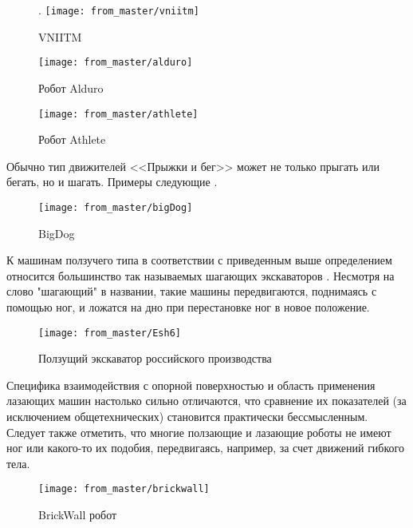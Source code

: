 \begin{figure}[H].
\centering\texttt{[image: from\_master/vniitm]}
\caption{VNIITM}
\label{fig:vniitm}
\end{figure}

\begin{figure}[H]
\centering\texttt{[image: from\_master/alduro]}
\caption{Робот Alduro}
\label{fig:alduro}
\end{figure}

\begin{figure}[H]
\centering\texttt{[image: from\_master/athlete]}
\caption{Робот Athlete}
\label{fig:athlete}
\end{figure}

Обычно тип движителей <<Прыжки и бег>> может не только прыгать или бегать, но и шагать. Примеры следующие \cite{Pavl2013,Volkova2013modeling,bidgoly2010learning,Yachun2010} .

\begin{figure}[H]
    \centering\texttt{[image: from\_master/bigDog]}
\caption{BigDog}
\label{fig:bigDog}
\end{figure}

К машинам ползучего типа в соответствии с приведенным выше определением относится большинство так называемых шагающих экскаваторов . Несмотря на слово "шагающий" в названии, такие машины передвигаются, поднимаясь с помощью ног, и ложатся на дно при перестановке ног в новое положение.

\begin{figure}[H]
\centering\texttt{[image: from\_master/Esh6]}
\caption{Ползущий экскаватор российского производства}
\label{fig:Esh6}
\end{figure}

\cite{peters2010prototype,Grad2014,bidgoly2010learning} Специфика взаимодействия с опорной поверхностью и область применения лазающих машин настолько сильно отличаются, что сравнение их показателей (за исключением общетехнических) становится практически бессмысленным. Следует также отметить, что многие ползающие и лазающие роботы не имеют ног или какого-то их подобия, передвигаясь, например, за счет движений гибкого тела.

\begin{figure}[H]
\centering\texttt{[image: from\_master/brickwall]}
\caption{BrickWall робот}
\label{fig:brickwall}
\end{figure}

